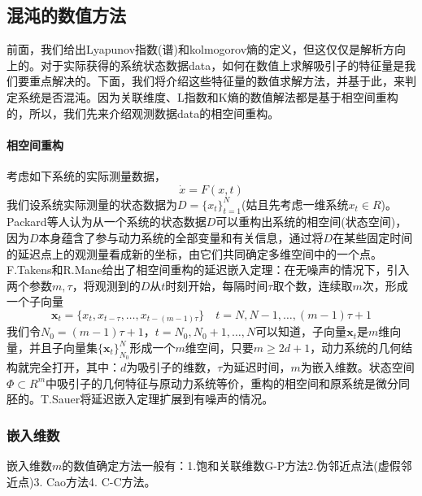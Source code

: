     \subsection{混沌的数值方法}
        \par
        前面，我们给出Lyapunov指数(谱)和kolmogorov熵的定义，但这仅仅是解析方向上的。对于实际获得的系统状态数据data，如何在数值上求解吸引子的特征量是我们要重点解决的。下面，我们将介绍这些特征量的数值求解方法，并基于此，来判定系统是否混沌。因为关联维度、L指数和K熵的数值解法都是基于相空间重构的，所以，我们先来介绍观测数据data的相空间重构。
        \paragraph{相空间重构}考虑如下系统的实际测量数据，
        \[
            \dot{x} = F(x,t)
        \]
        我们设系统实际测量的状态数据为$D = \{x_t\}_{t=1}^N$(姑且先考虑一维系统$x_t\in R$)。Packard等人认为从一个系统的状态数据$D$可以重构出系统的相空间(状态空间)，因为$D$本身蕴含了参与动力系统的全部变量和有关信息，通过将$D$在某些固定时间的延迟点上的观测量看成新的坐标，由它们共同确定多维空间中的一个点。F.Takens和R.Mane给出了相空间重构的延迟嵌入定理：在无噪声的情况下，引入两个参数$m,\tau$，将观测到的$D$从$t$时刻开始，每隔时间$\tau$取个数，连续取$m$次，形成一个子向量
        \[
            \mathbf{x}_t = \{x_t,x_{t-\tau},\dots,x_{t-(m-1)\tau}\}\quad t = N,N-1,\dots,(m-1)\tau+1
        \]
        我们令$N_0=(m-1)\tau+1$，$t=N_0,N_0+1,\dots,N$可以知道，子向量$\mathbf{x}_t$是$m$维向量，并且子向量集$\{\mathbf{x}_t\}_{N_0}^N$形成一个$m$维空间，只要$m\geq 2d+1$，动力系统的几何结构就完全打开，其中：$d$为吸引子的维数，$\tau$为延迟时间，$m$为嵌入维数。状态空间$\Phi \subset R^m$中吸引子的几何特征与原动力系统等价，重构的相空间和原系统是微分同胚的。T.Sauer将延迟嵌入定理扩展到有噪声的情况。

        \subsubsection{嵌入维数}
            \par
            嵌入维数$m$的数值确定方法一般有：1.饱和关联维数G-P方法2.伪邻近点法(虚假邻近点)3. Cao方法4. C-C方法。
